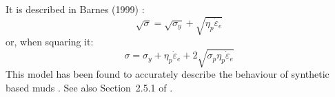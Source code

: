 
It is described in Barnes (1999) \cite{barn99}:
\begin{equation}
\sqrt{\sigma} = \sqrt{\sigma_y} + \sqrt{\eta_p \dot{\varepsilon}_e} 
\end{equation}
or, when squaring it:
\begin{equation}
\sigma = \sigma_y + \eta_p \dot{\varepsilon}_e + 2\sqrt{\sigma_p \eta_p \dot{\varepsilon}_e} 
\end{equation}
This model has been found to accurately describe the behaviour of synthetic based muds \cite{adlo17}. 
See also Section~2.5.1 of \textcite{macosko}. 
